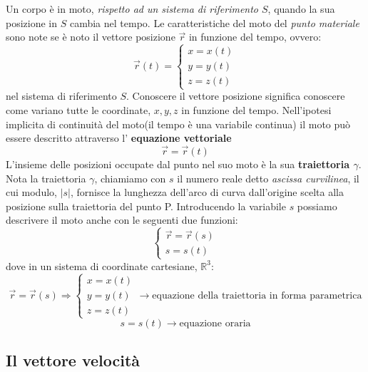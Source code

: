 \noindent Un corpo è in moto, \emph{rispetto ad un sistema di 
riferimento $S$}, quando la sua posizione in $S$ cambia
nel tempo. Le caratteristiche del moto del \emph{punto materiale}
sono note se è noto il vettore posizione $\vec{r}$ in funzione del
tempo, ovvero:
\[
    \vec{r}(t) = \begin{cases}
        x = x(t) \\
        y = y(t) \\
        z = z(t)
    \end{cases}
\]
nel sistema di riferimento $S$. 
Conoscere il vettore posizione significa conoscere come variano 
tutte le coordinate, $x, y, z$ in funzione del tempo. 
Nell'ipotesi implicita di continuità del moto(il tempo è una variabile
continua) il moto può essere descritto attraverso l' \textbf{equazione vettoriale}
\[
\vec{r} = \vec{r}(t)    
\]
L'insieme delle posizioni occupate dal punto nel suo moto è la sua
\textbf{traiettoria $\gamma$}. Nota la traiettoria $\gamma$, chiamiamo
con $s$ il numero reale detto \emph{ascissa curvilinea}, il cui modulo, $|s|$,
fornisce la lunghezza dell'arco di curva dall'origine scelta alla posizione
sulla traiettoria del punto P. Introducendo la variabile $s$ possiamo 
descrivere il moto anche con le seguenti due funzioni:
\[
    \begin{cases}
        \vec{r} = \vec{r}(s)    \\
        s = s(t)
    \end{cases}
\]
dove in un sistema di coordinate cartesiane, $\mathbb{R}^3$:
\[
    \vec{r} = \vec{r}(s)  \Longrightarrow 
    \begin{cases}
        x = x(t) \\
        y = y(t) \\
        z = z(t)
    \end{cases}
    \longrightarrow \text{equazione della traiettoria in forma parametrica}
\]
\[
   s= s(t) \longrightarrow \text{equazione oraria} 
\]

\subsection*{Il vettore velocità}


